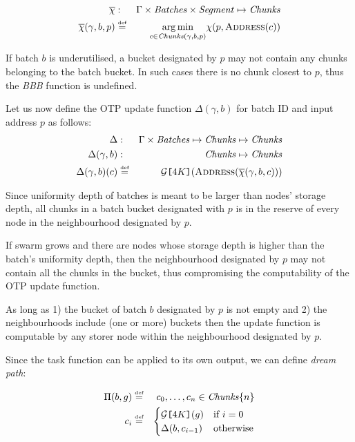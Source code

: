 \begin{eqnarray}
\overline{\Huge\chi}&:& \Gamma\times\mathit{Batches}\times \mathit{Segment} \mapsto \mathit{Chunks}\\
\overline{\Huge\chi}(\gamma,b,p)&\defeq &\underset{c\in \mathit{Chunks}(\gamma,b,p)}{\operatorname{arg\,min}}{\Large\chi}(p,\textsc{Address}(c))
\end{eqnarray}

If batch $b$ is underutilised, a bucket designated by $p$
may not contain any chunks belonging to the batch bucket.
In such cases there is no chunk closest to $p$, thus the \emph{BBB} function is undefined.

Let us now define the OTP update function $\Delta(\gamma,b)$
for batch ID and input address $p$ as follows: 
%
\begin{eqnarray}
{\Delta}&:&\Gamma\times\mathit{Batches}\mapsto\mathit{Chunks}\mapsto\mathit{Chunks}\\\
{\Delta}(\gamma, b)&:&\mathit{Chunks}\mapsto\mathit{Chunks}\\
\Delta(\gamma,b)(c)&\defeq&\mathcal{G}\idx{4K}(\textsc{Address}(\overline{\Huge\chi}(\gamma,b,c)))
\end{eqnarray}


Since uniformity depth of batches is meant to be larger than nodes' storage depth, all chunks in a batch bucket designated with $p$ is  in the reserve of every node in the neighbourhood designated by $p$. 

If swarm grows and  there are nodes whose storage  depth is higher than the batch's uniformity depth, then the neighbourhood designated by $p$ may not contain all the
chunks in the bucket, thus compromising the computability of the OTP update function.

As long as 1) the bucket of batch $b$ designated by $p$ is not empty and 2) the neighbourhoods include (one or more) buckets then the update function is computable by any storer node within the neighbourhood designated by $p$.

Since the task function can be applied to its own output, we can define \emph{dream path}:


\begin{eqnarray}
\Pi(b,g)&\overset{\textrm{\tiny def}}{=}&c_0,\ldots, c_n\in\mathit{Chunks}\{n\}\\
c_i&\overset{\textrm{\tiny def}}{=}&\begin{cases}
\mathcal{G}\texttt{[}\/4K\/\texttt{]}(g) &\text{if }i=0\\   
\Delta(b,c_{i-1}) &\text{otherwise}
\end{cases}
\end{eqnarray}

